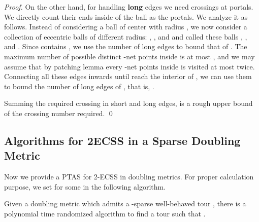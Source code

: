 \documentclass{llncs}
\begin{document}
\begin{proof}
On the other hand, for handling \textbf{long} edges we need  crossings at portals.
We directly count their ends inside of the ball as the portals.
We analyze it as follows.
Instead of considering a ball of center  with radius , we now consider a collection of eccentric balls of different radius: , , and  and called these balls , , and .
Since  contains , we use the number of long edges  to bound that of .
The maximum number of possible distinct -net points inside  is at most , and we may assume that by patching lemma every -net points inside  is visited at most twice.
Connecting all these edges inwards until reach the interior of , we can use them to bound the number of long edges of , that is, .

Summing the required crossing in short and long edges,  is a rough upper bound of the crossing number required.
\qed
\end{proof}

\subsection{Algorithms for 2ECSS in a Sparse Doubling Metric}

Now we provide a PTAS for 2-ECSS in doubling metrics.
For proper calculation purpose, we set  for some  in the following algorithm.
\begin{theorem}\label{longshort}
Given a doubling metric  which admits a -sparse well-behaved tour , there is a polynomial time randomized algorithm to find a tour  such that .
\end{theorem}
\end{document}
